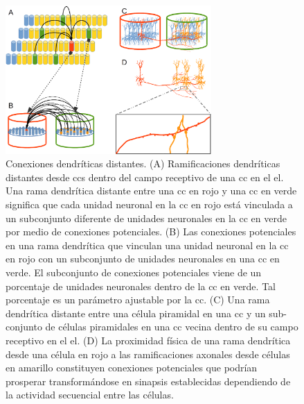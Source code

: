 \begin{figure}[h!]
    \centering
    \includegraphics[width=0.7\textwidth]{DistalDendrites.png}
    \caption{Conexiones dendríticas distantes. (A) Ramificaciones dendríticas distantes desde \glspl{cc} dentro del campo receptivo
	    de una \gls{cc} en el \gls{el}. Una rama dendrítica distante entre una \gls{cc} en rojo y una
	    \gls{cc} en verde significa que cada unidad neuronal en la \gls{cc} en rojo está vinculada a un subconjunto diferente
	    de unidades neuronales en la \gls{cc} en verde por medio de conexiones potenciales.
	    (B) Las conexiones potenciales en una rama dendrítica que vinculan una unidad neuronal en la \gls{cc} en rojo
	    con un subconjunto de unidades neuronales en una \gls{cc} en verde. El subconjunto de conexiones potenciales viene de un porcentaje de unidades neuronales
	    dentro de la \gls{cc} en verde. Tal porcentaje es un parámetro ajustable por la \gls{cc}.
	    (C) Una rama dendrítica distante entre una célula piramidal en una \gls{cc} y un 
	    sub-conjunto de células piramidales en una \gls{cc} vecina dentro de su campo receptivo
	    en el \gls{el}.
    (D) La proximidad física de una rama dendrítica desde una célula en rojo a las ramificaciones axonales desde células en amarillo constituyen conexiones potenciales
    que podrían prosperar transformándose en sinapsis establecidas dependiendo de la actividad secuencial entre las células.}
    \label{fig:DistalDendrites}
\end{figure}

